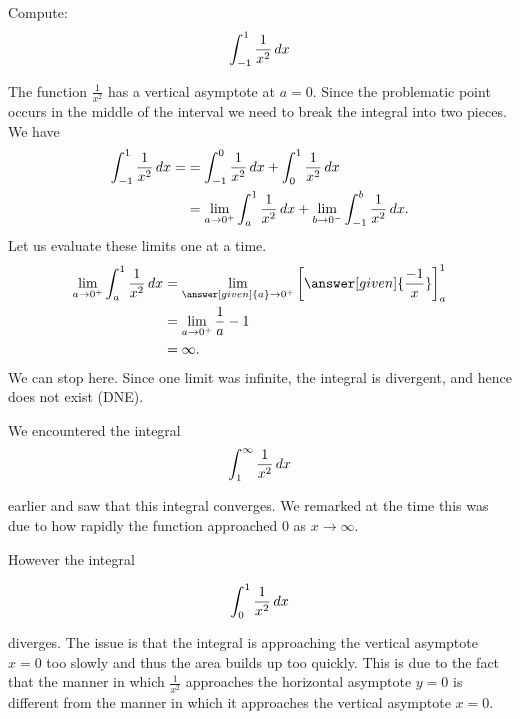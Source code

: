 \documentclass{ximera}
\begin{document}
\begin{example}
  Compute:
  \[
  \int_{-1}^1 \frac{1}{x^2} \mathop{}\!d x
  \]
  \begin{explanation}
    The function $\frac{1}{x^2}$ has a vertical asymptote at $a=0$. Since the problematic point
occurs in the middle of the interval we need to break the integral into two pieces.
  We have
\begin{align*}
  \int_{-1}^1 \frac{1}{x^2} \mathop{}\!d x =&= \int_{-1}^{0} \frac{1}{x^2} \mathop{}\!d x + \int_{0}^{1} \frac{1}{x^2} \mathop{}\!d x \\
&= \lim_{a \to 0^+} \int_{a}^1 \frac{1}{x^2} \mathop{}\!d x  + \lim_{b \to 0^-} \int_{-1}^{b} \frac{1}{x^2} \mathop{}\!d x.
 \end{align*}
  Let us evaluate these limits one at a time.
  \begin{align*}
    \lim_{a \to 0^+} \int_{a}^1 \frac{1}{x^2} \d x  &=  \lim_{\answer[given]{a} \to 0^+} \eval{\answer[given]{\frac{-1}{x}}}_a^1 \\
    &=  \lim_{a \to 0^+} \frac{1}{a}-1\\
    &= \infty.
  \end{align*}
    We can stop here. Since one limit was infinite, the integral is
    divergent, and hence does not exist (DNE).
  \end{explanation}
\end{example}

\begin{remark}
We encountered the integral
\[
\int_{1}^{\infty} \frac{1}{x^2} \mathop{}\!d x
\]

earlier and saw that this integral converges. We remarked at the time this was due to how rapidly the function approached $0$ as $x \to \infty$.

However the integral

\[
\int_{0}^{1} \frac{1}{x^2} \mathop{}\!d x
\]

diverges. The issue is that the integral is approaching the vertical asymptote $x=0$ too slowly and thus the area builds up too quickly. This is due to the fact that the manner in which $\frac{1}{x^2}$ approaches the horizontal asymptote $y=0$ is different from the manner in which
it approaches the vertical asymptote $x=0$.
\end{remark}
\end{document}
